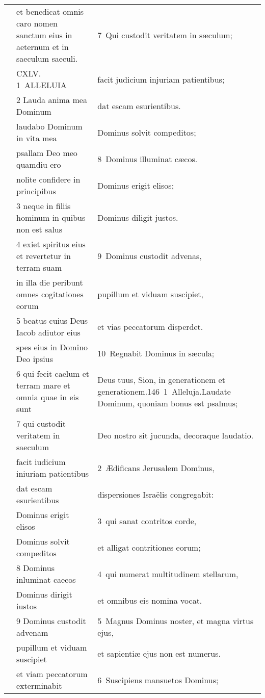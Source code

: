 \documentclass{article}
\begin{document}
\begin{longtable}{@{}p{}p{}p{}@{}}
	&	et benedicat omnis caro nomen sanctum eius in aeternum et in saeculum saeculi.	&	7 Qui custodit veritatem in sæculum;	\\
	&	CXLV. 1 ALLELUIA	&	facit judicium injuriam patientibus;	\\
	&	2 Lauda anima mea Dominum	&	dat escam esurientibus.	\\
	&	laudabo Dominum in vita mea	&	Dominus solvit compeditos;	\\
	&	psallam Deo meo quamdiu ero	&	8 Dominus illuminat cæcos.	\\
	&	nolite confidere in principibus	&	Dominus erigit elisos;	\\
	&	3 neque in filiis hominum in quibus non est salus	&	Dominus diligit justos.	\\
	&	4 exiet spiritus eius et revertetur in terram suam	&	9 Dominus custodit advenas,	\\
	&	in illa die peribunt omnes cogitationes eorum	&	pupillum et viduam suscipiet,	\\
	&	5 beatus cuius Deus Iacob adiutor eius	&	et vias peccatorum disperdet.	\\
	&	spes eius in Domino Deo ipsius	&	10 Regnabit Dominus in sæcula;	\\
	&	6 qui fecit caelum et terram mare et omnia quae in eis sunt	&	Deus tuus, Sion, in generationem et generationem.146 1 Alleluja.Laudate Dominum, quoniam bonus est psalmus;	\\
	&	7 qui custodit veritatem in saeculum	&	Deo nostro sit jucunda, decoraque laudatio.	\\
	&	facit iudicium iniuriam patientibus	&	2 Ædificans Jerusalem Dominus,	\\
	&	dat escam esurientibus	&	dispersiones Israëlis congregabit:	\\
	&	Dominus erigit elisos	&	3 qui sanat contritos corde,	\\
	&	Dominus solvit compeditos	&	et alligat contritiones eorum;	\\
	&	8 Dominus inluminat caecos	&	4 qui numerat multitudinem stellarum,	\\
	&	Dominus dirigit iustos	&	et omnibus eis nomina vocat.	\\
	&	9 Dominus custodit advenam	&	5 Magnus Dominus noster, et magna virtus ejus,	\\
	&	pupillum et viduam suscipiet	&	et sapientiæ ejus non est numerus.	\\
	&	et viam peccatorum exterminabit	&	6 Suscipiens mansuetos Dominus;	\\

\end{longtable}
\end{document}
